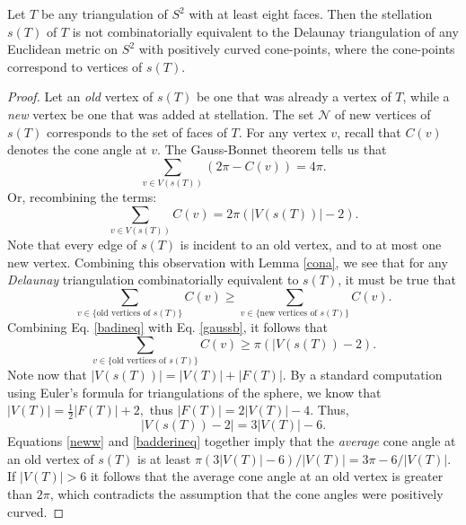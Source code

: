 \documentclass{acmart}
\newcommand{\thm}[2]{\begin{#1} #2 \end{#1}}
\begin{document}
\thm{claim}
{
Let $T$ be any triangulation of $S^{2}$ with at least eight faces. 
Then the stellation $s(T)$ of $T$ is not combinatorially equivalent 
to the Delaunay triangulation of any Euclidean metric on $S^{2}$ with 
positively curved cone-points, where the cone-points correspond to 
vertices of $s(T)$.
}

\begin{proof} Let an \emph{old} vertex of $s(T)$ be one that 
was already a vertex of $T$, while a \emph{new} vertex be one that was 
added at stellation. The set $\mathcal{N}$ of new vertices of $s(T)$ corresponds 
to the  set of  faces of $T$. For any vertex $v$, recall that $C(v)$ 
denotes the cone angle at $v$. The Gauss-Bonnet theorem tells us that
\begin{equation}
\sum_{v\in V(s(T))}(2\pi - C(v)) = 4\pi.
\end{equation}
Or, recombining the terms:
\begin{equation}
\label{gaussb}
\sum_{v\in V(s(T))}C(v) = 2\pi (|V(s(T))| - 2).
\end{equation}
Note that every edge of $s(T)$ is incident to an old vertex, and to 
at most one new vertex. Combining this observation with Lemma \ref{cona},
we see that for any \emph{Delaunay} triangulation combinatorially
equivalent to $s(T)$, it must be true  that
\begin{equation}
\label{badineq}
\sum_{v \in \{\mbox{old vertices of $s(T)$}\}} C(v) \geq 
\sum_{v \in \{\mbox{new vertices of $s(T)$}\}} C(v).
\end{equation}
Combining Eq. \ref{badineq} with Eq. \ref{gaussb}, it follows that
\begin{equation}
\label{badderineq}
\sum_{v \in \{\mbox{old vertices of $s(T)$}\}} C(v) \geq \pi (|V(s(T)) - 
2).
\end{equation}
Note now that $|V(s(T))| = |V(T)| + |F(T)|$. By a standard 
computation using Euler's formula for triangulations of the sphere, 
we know that $|V(T)| = \frac12 |F(T)| + 2,$ thus $|F(T)| = 2 |V(T)| - 4.$
Thus, 
\begin{equation}
\label{neww}
|V(s(T))-2| = 3 |V(T)| - 6.
\end{equation}
Equations \ref{neww} and \ref{badderineq} together imply that the
\emph{average} cone angle at an old vertex of $s(T)$ is at least 
$\pi(3 |V(T)| - 6)/|V(T)| = 3 \pi - 6/|V(T)|.$
If $|V(T)| > 6$ it follows that the average cone angle at an old
vertex is greater  than $2\pi$, which contradicts the assumption that
the cone angles were positively curved.
\end{proof}
\end{document}
